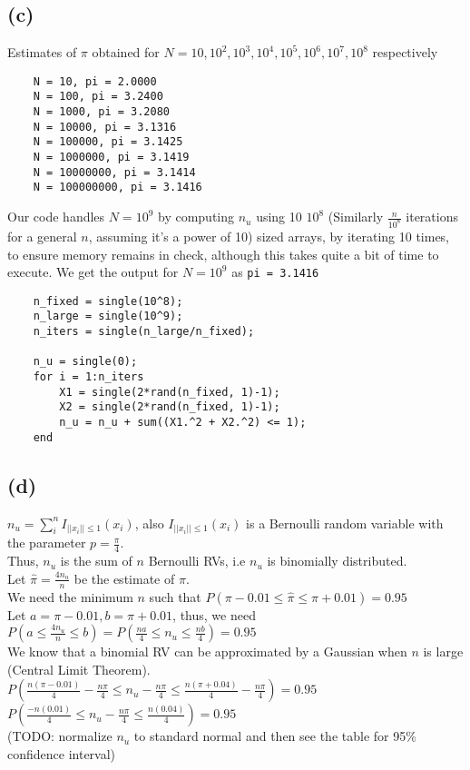 \documentclass[11pt, fleqn]{article}
\begin{document}
\subsection*{(c)}
Estimates of $\pi$ obtained for $N = 10, 10^2, 10^3, 10^4, 10^5, 10^6, 10^7, 10^8$ respectively
\begin{verbatim}
    N = 10, pi = 2.0000 
    N = 100, pi = 3.2400 
    N = 1000, pi = 3.2080 
    N = 10000, pi = 3.1316 
    N = 100000, pi = 3.1425 
    N = 1000000, pi = 3.1419 
    N = 10000000, pi = 3.1414 
    N = 100000000, pi = 3.1416 
\end{verbatim}
Our code handles $N = 10^9$ by computing $n_u$ using 10 $10^8$ (Similarly $\frac{n}{10^8}$ iterations for a general $n$, assuming it's a power of 10) sized arrays, by iterating 10 times, to ensure memory remains in check, although this takes quite a bit of time to execute. We get the output for $N = 10^9$ as \texttt{pi = 3.1416}
\begin{verbatim}
    n_fixed = single(10^8);
    n_large = single(10^9);
    n_iters = single(n_large/n_fixed);
    
    n_u = single(0);
    for i = 1:n_iters
        X1 = single(2*rand(n_fixed, 1)-1);
        X2 = single(2*rand(n_fixed, 1)-1);
        n_u = n_u + sum((X1.^2 + X2.^2) <= 1);
    end
\end{verbatim}

\subsection*{(d)}
$n_u = \sum_{i}^n I_{||x_i||\le 1}(x_i)$, also $I_{||x_i||\le 1}(x_i)$ is a Bernoulli random variable with the parameter $p = \frac{\pi}{4}$.\\
Thus, $n_u$ is the sum of $n$ Bernoulli RVs, i.e $n_u$ is binomially distributed.\\
Let $\hat \pi = \frac{4n_u}{n}$ be the estimate of $\pi$.\\
We need the minimum $n$ such that $ P(\pi - 0.01 \le \hat\pi \le \pi + 0.01) = 0.95$\\
Let $a = \pi - 0.01, b = \pi + 0.01$, thus, we need $P(a \le \frac{4n_u}{n} \le b) = P(\frac{na}{4} \le n_u \le \frac{nb}{4}) = 0.95$\\
We know that a binomial RV can be approximated by a Gaussian when $n$ is large (Central Limit Theorem).\\
$ P(\frac{n(\pi - 0.01)}{4}-\frac{n\pi}{4} \le n_u-\frac{n\pi}{4} \le \frac{n(\pi+0.04)}{4}-\frac{n\pi}{4}) = 0.95 $\\
$ P(\frac{-n(0.01)}{4} \le n_u-\frac{n\pi}{4} \le \frac{n(0.04)}{4}) = 0.95 $\\
(TODO: normalize $n_u$ to standard normal and then see the table for 95\% confidence interval)
\end{document}
